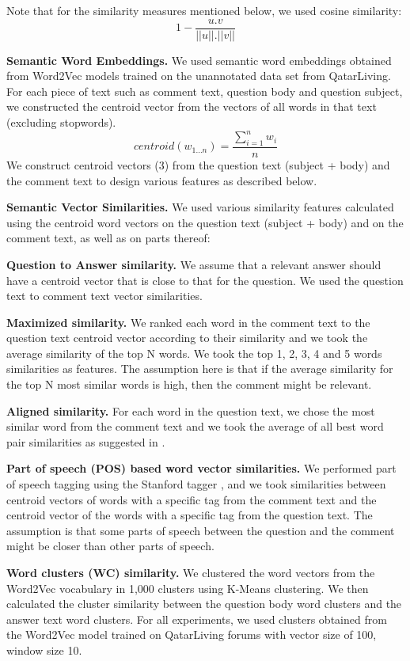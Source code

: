 \documentclass[12pt, a4paper, oneside]{Thesis} %
\begin{document}
Note that for the similarity measures mentioned below, we used cosine similarity:
\[ 1 - \frac{u.v}{||u||.||v||} \tag{2} \label{equation:2} \]

\textbf{Semantic Word Embeddings.} We used semantic word embeddings obtained from Word2Vec models trained on the unannotated data set from QatarLiving. For each piece of text such as comment text, question body and question subject, we constructed the centroid vector from the vectors of all words in that text (excluding stopwords).
\[ centroid(w_{1...n}) = \frac{\sum\limits_{i=1}^{n} w_i}{n} \tag{3} \label{equation:3} \]
We construct centroid vectors (3) from the question text (subject + body) and the comment text to design various features as described below.

\textbf{Semantic Vector Similarities.} We used various similarity features calculated using the centroid word vectors on the question text (subject + body) and on the comment text, as well as on parts thereof:

\textbf{Question to Answer similarity.} We assume that a relevant answer should have a centroid vector that is close to that for the question. We used the question text to comment text vector similarities.

\textbf{Maximized similarity.} We ranked each word in the comment text to the question text centroid vector according to their similarity and we took the average similarity of the top N words. We took the top 1, 2, 3, 4 and 5 words similarities as features. The assumption here is that if the average similarity for the top N most similar words is high, then the comment might be relevant.

\textbf{Aligned similarity.} For each word in the question text, we chose the most similar word from the comment text and we took the average of all best word pair similarities as suggested in \cite{tran2015jaist}.

\textbf{Part of speech (POS) based word vector similarities.} We performed part of speech tagging using the Stanford tagger \cite{toutanova2003feature}, and we took similarities between centroid vectors of words with a specific tag from the comment text and the centroid vector of the words with a specific tag from the question text. The assumption is that some parts of speech between the question and the comment might be closer than other parts of speech.

\textbf{Word clusters (WC) similarity.} We clustered the word vectors from the Word2Vec vocabulary in 1,000 clusters using K-Means clustering. We then calculated the cluster similarity between the question body word clusters and the answer text word clusters. For all experiments, we used clusters obtained from the Word2Vec model trained on QatarLiving forums with vector size of 100, window size 10.
\end{document}
